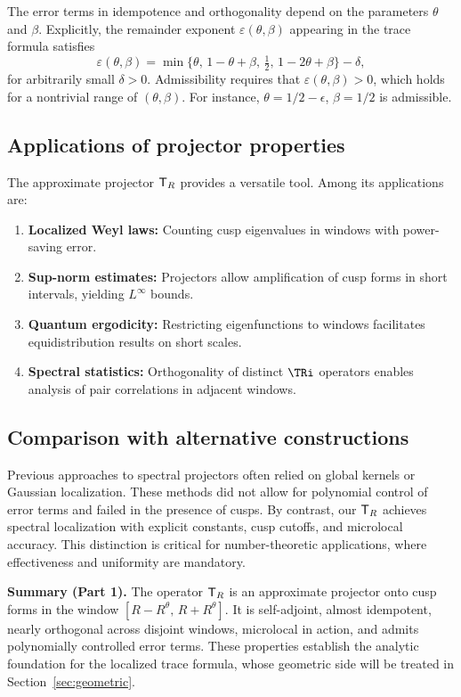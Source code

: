 The error terms in idempotence and orthogonality depend on the parameters $\theta$ and $\beta$. Explicitly, the remainder exponent $\varepsilon(\theta,\beta)$ appearing in the trace formula satisfies
\[
\varepsilon(\theta,\beta) = \min\{\theta,\,1-\theta+\beta,\,\tfrac12,\,1-2\theta+\beta\} - \delta,
\]
for arbitrarily small $\delta>0$. Admissibility requires that $\varepsilon(\theta,\beta)>0$, which holds for a nontrivial range of $(\theta,\beta)$. For instance, $\theta=1/2-\epsilon$, $\beta=1/2$ is admissible.

\subsection{Applications of projector properties}\label{subsec:proj-applications}

The approximate projector $\mathsf{T}_R$ provides a versatile tool. Among its applications are:
\begin{enumerate}
\item \textbf{Localized Weyl laws:} Counting cusp eigenvalues in windows with power-saving error.
\item \textbf{Sup-norm estimates:} Projectors allow amplification of cusp forms in short intervals, yielding $L^\infty$ bounds.
\item \textbf{Quantum ergodicity:} Restricting eigenfunctions to windows facilitates equidistribution results on short scales.
\item \textbf{Spectral statistics:} Orthogonality of distinct $\TRi$ operators enables analysis of pair correlations in adjacent windows.
\end{enumerate}

\subsection{Comparison with alternative constructions}\label{subsec:proj-comparison}

Previous approaches to spectral projectors often relied on global kernels or Gaussian localization. These methods did not allow for polynomial control of error terms and failed in the presence of cusps. By contrast, our $\mathsf{T}_R$ achieves spectral localization with explicit constants, cusp cutoffs, and microlocal accuracy. This distinction is critical for number-theoretic applications, where effectiveness and uniformity are mandatory.

\bigskip
\noindent\textbf{Summary (Part 1).} The operator $\mathsf{T}_R$ is an approximate projector onto cusp forms in the window $[R-R^\theta,\,R+R^\theta]$. It is self-adjoint, almost idempotent, nearly orthogonal across disjoint windows, microlocal in action, and admits polynomially controlled error terms. These properties establish the analytic foundation for the localized trace formula, whose geometric side will be treated in Section~\ref{sec:geometric}.

